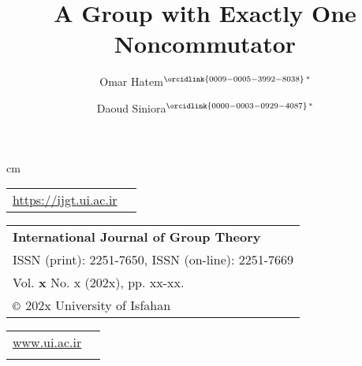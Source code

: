 \documentclass[11pt,twoside]{amsart}
\numberwithin{equation}{section}
\begin{document}
 cm
\begin{tabular}{c r}
\vspace{-0.6cm}
\href{https://ijgt.ui.ac.ir/}{\scriptsize  \rm https://ijgt.ui.ac.ir}\\
\end{tabular}
\hfill
\begin{tabular}{l}
\hline
\vspace{-0.2cm}
\scriptsize \rm\bf International Journal of Group Theory\\
\vspace{-0.2cm}
\scriptsize \rm ISSN (print): 2251-7650, ISSN (on-line): 2251-7669 \\
\vspace{-0.2cm}
\scriptsize Vol. {\bf\rm x} No. x {\rm(}202x{\rm)}, pp. xx-xx.\\
\scriptsize $\copyright$ 202x University of Isfahan\\
\hline
\end{tabular}
\hfill
\begin{tabular}{c c}
\vspace{-0.1cm}
\href{www.ui.ac.ir}{\scriptsize \rm www.ui.ac.ir}\\
\vspace{-1cm}
\end{tabular}
\vspace{1.3 cm}


\title{A Group with Exactly One Noncommutator}
\author{Omar Hatem$^{\orcidlink{0009-0005-3992-8038}}$$^*$}
\author{Daoud Siniora$^{\orcidlink{0000-0003-0929-4087}}$$^*$}
\end{document}
